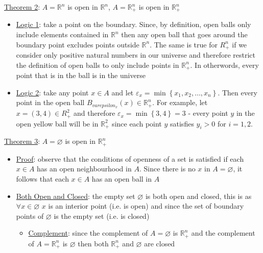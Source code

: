 \documentclass{article}
\begin{document}
  \par
  \underline{Theorem 2}: $A = \mathbb{R}^{n}$ is open in $\mathbb{R}^{n}$, $A = \mathbb{R}^{n}_{+}$ is open in $\mathbb{R}^{n}_{+}$
  \begin{itemize}
    \item  \underline{Logic 1}: take a point on the boundary. Since, by definition, open balls only include elements contained in $\mathbb{R}^{n}$ then any open ball that goes around the boundary point excludes points outside $\mathbb{R}^{n}$. The same is true for $R^{n}_{+}$ if we consider only positive natural numbers in our universe and therefore restrict the definition of open balls to only include points in $\mathbb{R}_{+}^{n}$. In otherwords, every point that is in the ball is in the universe
    \item  \underline{Logic 2}: take any point $x \in A$ and let $\varepsilon_{x} = \min \left\{x_{1}, x_{2}, \dots, x_{n} \right\}$. Then every point in the open ball $B_{varepsilon_{x}}(x) \in \mathbb{R}_{+}^{n}$. For example, let $x = (3,4) \in R_{+}^{2}$ and therefore $\varepsilon_{x} = \min \left\{ 3, 4 \right\} = 3$ - every point $y$ in the open yellow ball will be in $\mathbb{R}_{+}^{2}$ since each point $y$ satisfies $y_{i} > 0$ for $i = 1, 2$.
  \end{itemize}
  \par
  \underline{Theorem 3}: $A = \varnothing$ is open in $\mathbb{R}_{+}^{n}$
  \begin{itemize}
    \item  \underline{Proof}: observe that the conditions of openness of a set is satisfied if each $x \in A$ has an open neighbourhood in $A$. Since there is no $x$ in $A = \varnothing$, it follows that each $x \in A$ has an open ball in $A$
    \item  \underline{Both Open and Closed}: the empty set $\varnothing$ is both open and closed, this is as $\forall x \in \varnothing$ $x$ is an interior point (i.e. is open) and since the set of boundary points of $\varnothing$ is the empty set (i.e. is closed)
    \begin{itemize}
      \item  \underline{Complement}: since the complement of $A = \varnothing$ is $\mathbb{R}_{+}^{n}$ and the complement of $A = \mathbb{R}_{+}^{n}$ is $\varnothing$ then both $\mathbb{R}_{+}^{n}$ and $\varnothing$ are closed
    \end{itemize}
  \end{itemize}
  \par
\vspace{6mm}
\end{document}
